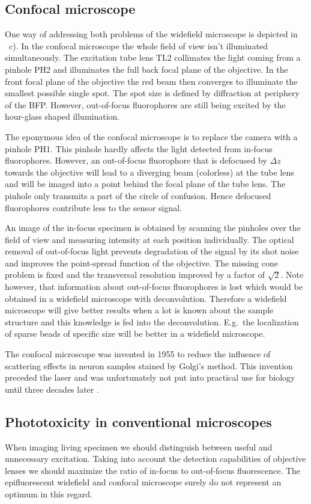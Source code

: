 \subsection{Confocal microscope}
One way of addressing both problems of the widefield microscope is
depicted in ~c). In the confocal
microscope the whole field of view isn't illuminated simultaneously.
The excitation tube lens TL2 collimates the light coming from a
pinhole PH2 and illuminates the full back focal plane of the
objective. In the front focal plane of the objective the red beam then
converges to illuminate the smallest possible single spot. The spot
size is defined by diffraction at periphery of the BFP. However,
out-of-focus fluorophores are still being excited by the hour-glass
shaped illumination.

The eponymous idea of the confocal microscope is to replace the camera
with a pinhole PH1. This pinhole hardly affects the light detected
from in-focus fluorophores. However, an out-of-focus fluorophore that
is defocused by $\Delta z$ towards the objective will lead to a
diverging beam (colorless) at the tube lens and will be imaged into a
point behind the focal plane of the tube lens. The pinhole only
transmits a part of the circle of confusion. Hence defocused
fluorophores contribute less to the sensor signal.

An image of the in-focus specimen is obtained by scanning the pinholes
over the field of view and measuring intensity at each position
individually. The optical removal of out-of-focus light prevents
degradation of the signal by its shot noise and improves the
point-spread function of the objective. The missing cone problem is
fixed and the transversal resolution improved by a factor of $\sqrt
2$. Note however, that information about out-of-focus fluorophores is
lost which would be obtained in a widefield microscope with
deconvolution. Therefore a widefield microscope will give better
results when a lot is known about the sample structure and this
knowledge is fed into the deconvolution. E.g.\ the localization of
sparse beads of specific size will be better in a widefield
microscope.

The confocal microscope was invented in 1955  \citep{Minsky1961,Minsky1988} to reduce the influence of
scattering effects in neuron samples stained by Golgi's method. This
invention preceded the laser and was unfortunately not put into
practical use for biology until three decades later \citep{Amos1987}.
\subsection{Phototoxicity in conventional microscopes}
When imaging living specimen we should distinguish between useful and
unnecessary excitation. Taking into account the detection capabilities
of objective lenses we should maximize the ratio of in-focus to
out-of-focus fluorescence. The epifluorescent widefield and confocal
microscope surely do not represent an optimum in this regard.

